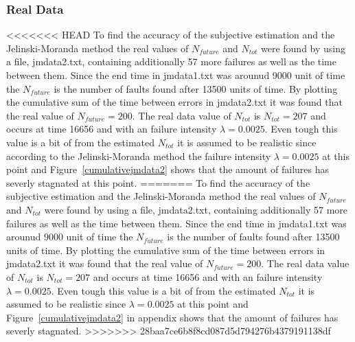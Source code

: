 \subsubsection*{Real Data}
<<<<<<< HEAD
\label{realdatajm}
To find the accuracy of the subjective estimation and the Jelinski-Moranda method the real values of $N_{future}$ and $N_{tot}$ were found by using a file, jmdata2.txt, containing additionally 57 more failures as well as the time between them. Since the end time in jmdata1.txt was arounud 9000 unit of time the $N_{future}$ is the number of faults found after 13500 units of time. By plotting the cumulative sum of the time between errors in jmdata2.txt it was found that the real value of $N_{future}=200$. The real data value of $N_{tot}$ is $N_{tot}=207$ and occurs at time 16656 and with an failure intensity $\lambda=0.0025$. Even tough this value is a bit of from the estimated $N_{tot}$ it is assumed to be realistic since according to the Jelinski-Moranda method the failure intensity $\lambda=0.0025$ at this point and Figure~\ref{cumulativejmdata2} shows that the amount of failures has severly stagnated at this point.
=======
To find the accuracy of the subjective estimation and the Jelinski-Moranda method the real values of $N_{future}$ and $N_{tot}$ were found by using a file, jmdata2.txt, containing additionally 57 more failures as well as the time between them. Since the end time in jmdata1.txt was arounud 9000 unit of time the $N_{future}$ is the number of faults found after 13500 units of time. By plotting the cumulative sum of the time between errors in jmdata2.txt it was found that the real value of $N_{future}=200$. The real data value of $N_{tot}$ is $N_{tot}=207$ and occurs at time 16656 and with an failure intensity $\lambda=0.0025$. Even tough this value is a bit of from the estimated $N_{tot}$ it is assumed to be realistic since $\lambda=0.0025$ at this point and Figure~\ref{cumulativejmdata2} in appendix shows that the amount of failures has severly stagnated.
>>>>>>> 28baa7ce6b8f8cd087d5d794276b4379191138df

